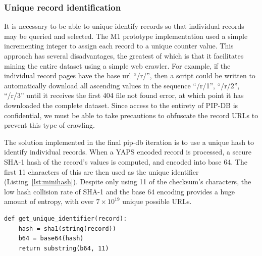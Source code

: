 \newpage

\subsubsection*{Unique record identification}

It is necessary to be able to unique identify records so that
individual records may be queried and selected. The M1 prototype
implementation used a simple incrementing integer to assign each
record to a unique counter value. This approach has several
disadvantages, the greatest of which is that it facilitates mining the
entire dataset using a simple web crawler. For example, if the
individual record pages have the base url ``/r/'', then a script could
be written to automatically download all ascending values in the
sequence ``/r/1'', ``/r/2'', ``/r/3'' until it receives the first 404
file not found error, at which point it has downloaded the complete
dataset. Since access to the entirety of PIP-DB is confidential, we
must be able to take precautions to obfuscate the record URLs to
prevent this type of crawling.

The solution implemented in the final pip-db iteration is to use a
unique hash to identify individual records. When a YAPS encoded record
is processed, a secure SHA-1 hash of the record's values is computed,
and encoded into base 64. The first 11 characters of this are then
used as the unique identifier (Listing~\ref{lst:minihash}). Despite
only using 11 of the checksum's characters, the low hash collision
rate of SHA-1 and the base 64 encoding provides a huge amount of
entropy, with over $7 \times 10^{19}$ unique possible URLs.\\

\lstset{language=python}
\begin{lstlisting}[label=lst:minihash,caption={%
      [Pseudocode for generating unique record identifiers]
       Pseudocode for generating unique record identifiers, See
       \texttt{util.clj} for the Clojure implementation.}]
def get_unique_identifier(record):
    hash = sha1(string(record))
    b64 = base64(hash)
    return substring(b64, 11)
\end{lstlisting}


\vspace{2cm}



